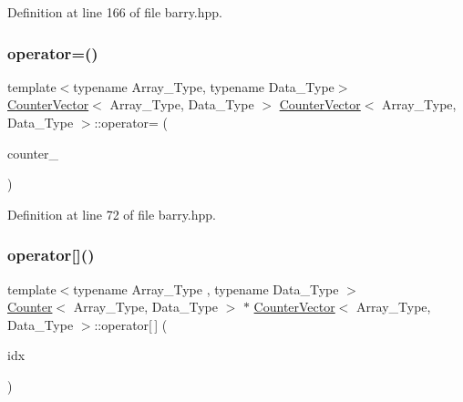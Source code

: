 Definition at line 166 of file barry.\+hpp.

\mbox{\label{classbarry_1_1_counter_vector_a2bfd2bd8e1d5a723cbc3a5538988a944}} 
\subsubsection{\texorpdfstring{operator=()}{operator=()}}
{\footnotesize\ttfamily template$<$typename Array\+\_\+\+Type, typename Data\+\_\+\+Type$>$ \\
\hyperlink{classbarry_1_1_counter_vector}{Counter\+Vector}$<$ Array\+\_\+\+Type, Data\+\_\+\+Type $>$ \hyperlink{classbarry_1_1_counter_vector}{Counter\+Vector}$<$ Array\+\_\+\+Type, Data\+\_\+\+Type $>$\+::operator= (\begin{DoxyParamCaption}\item[{const \hyperlink{classbarry_1_1_counter_vector}{Counter\+Vector}$<$ Array\+\_\+\+Type, Data\+\_\+\+Type $>$ \&}]{counter\+\_\+ }\end{DoxyParamCaption})}



Definition at line 72 of file barry.\+hpp.

\mbox{\label{classbarry_1_1_counter_vector_a6eac3e73298e1e6d424b92f324ffe9a8}} 
\subsubsection{\texorpdfstring{operator[]()}{operator[]()}}
{\footnotesize\ttfamily template$<$typename Array\+\_\+\+Type , typename Data\+\_\+\+Type $>$ \\
\hyperlink{classbarry_1_1_counter}{Counter}$<$ Array\+\_\+\+Type, Data\+\_\+\+Type $>$ $\ast$ \hyperlink{classbarry_1_1_counter_vector}{Counter\+Vector}$<$ Array\+\_\+\+Type, Data\+\_\+\+Type $>$\+::operator\mbox{[}$\,$\mbox{]} (\begin{DoxyParamCaption}\item[{\hyperlink{namespacebarry_a11dfc53ddb4672278319aa04f1e09a6c}{uint}}]{idx }\end{DoxyParamCaption})\hspace{0.3cm}{\ttfamily [inline]}}



